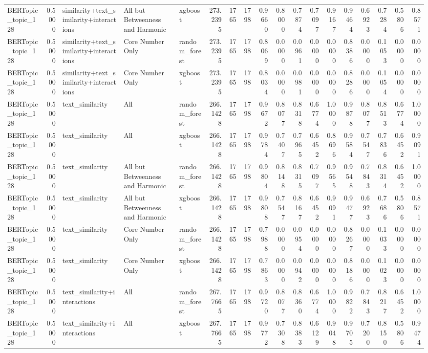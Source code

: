 \begin{tabular}{lrlllrrrrrrrrrrrrr}
BERTopic_topic_128 & 0.5000 & similarity+text_similarity+interactions & All but Betweenness and Harmonic & xgboost & 273.2395 & 1765 & 1798 & 0.9660 & 0.8000 & 0.7874 & 0.7097 & 0.9167 & 0.9464 & 0.6923 & 0.7284 & 0.5806 & 0.8571 \\
BERTopic_topic_128 & 0.5000 & similarity+text_similarity+interactions & Core Number Only & random_forest & 273.2395 & 1765 & 1798 & 0.8069 & 0.0000 & 0.0961 & 0.0000 & 0.0000 & 0.8386 & 0.0000 & 0.1053 & 0.0000 & 0.0000 \\
BERTopic_topic_128 & 0.5000 & similarity+text_similarity+interactions & Core Number Only & xgboost & 273.2395 & 1765 & 1798 & 0.8034 & 0.0000 & 0.0981 & 0.0000 & 0.0000 & 0.8286 & 0.0000 & 0.1054 & 0.0000 & 0.0000 \\
BERTopic_topic_128 & 0.5000 & text_similarity & All & random_forest & 266.1428 & 1765 & 1798 & 0.9672 & 0.8077 & 0.8318 & 0.6774 & 1.0000 & 0.9878 & 0.8077 & 0.8513 & 0.6774 & 1.0000 \\
BERTopic_topic_128 & 0.5000 & text_similarity & All & xgboost & 266.1428 & 1765 & 1798 & 0.9784 & 0.7407 & 0.7965 & 0.6452 & 0.8696 & 0.9584 & 0.7547 & 0.7836 & 0.6452 & 0.9091 \\
BERTopic_topic_128 & 0.5000 & text_similarity & All but Betweenness and Harmonic & random_forest & 266.1428 & 1765 & 1798 & 0.9804 & 0.8148 & 0.8315 & 0.7097 & 0.9565 & 0.9548 & 0.7843 & 0.8314 & 0.6452 & 1.0000 \\
BERTopic_topic_128 & 0.5000 & text_similarity & All but Betweenness and Harmonic & xgboost & 266.1428 & 1765 & 1798 & 0.9808 & 0.7547 & 0.8167 & 0.6452 & 0.9091 & 0.9477 & 0.6923 & 0.7686 & 0.5806 & 0.8571 \\
BERTopic_topic_128 & 0.5000 & text_similarity & Core Number Only & random_forest & 266.1428 & 1765 & 1798 & 0.7988 & 0.0000 & 0.0954 & 0.0000 & 0.0000 & 0.8267 & 0.0000 & 0.1033 & 0.0000 & 0.0000 \\
BERTopic_topic_128 & 0.5000 & text_similarity & Core Number Only & xgboost & 266.1428 & 1765 & 1798 & 0.7863 & 0.0000 & 0.0942 & 0.0000 & 0.0000 & 0.8186 & 0.0000 & 0.1023 & 0.0000 & 0.0000 \\
BERTopic_topic_128 & 0.5000 & text_similarity+interactions & All & random_forest & 267.7665 & 1765 & 1798 & 0.9720 & 0.8077 & 0.8360 & 0.6774 & 1.0000 & 0.9822 & 0.7843 & 0.8217 & 0.6452 & 1.0000 \\
BERTopic_topic_128 & 0.5000 & text_similarity+interactions & All & xgboost & 267.7665 & 1765 & 1798 & 0.9772 & 0.7308 & 0.8383 & 0.6129 & 0.9048 & 0.9705 & 0.7200 & 0.8150 & 0.5806 & 0.9474 \\

\end{tabular}

